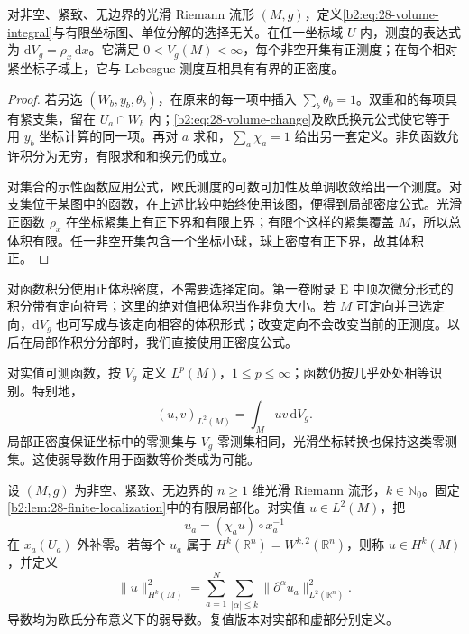 \begin{proposition}[体积积分的选择无关性]\label{b2:prop:28-volume-invariant}
对非空、紧致、无边界的光滑 Riemann 流形 \((M,g)\)，定义\eqref{b2:eq:28-volume-integral}与有限坐标图、单位分解的选择无关。在任一坐标域 \(U\) 内，测度的表达式为 \(\mathrm dV_g=\rho_x\,\mathrm dx\)。它满足 \(0<V_g(M)<\infty\)，每个非空开集有正测度；在每个相对紧坐标子域上，它与 Lebesgue 测度互相具有有界的正密度。
\end{proposition}
\begin{proof}
若另选 \((W_b,y_b,\theta_b)\)，在原来的每一项中插入 \(\sum_b\theta_b=1\)。双重和的每项具有紧支集，留在 \(U_a\cap W_b\) 内；\eqref{b2:eq:28-volume-change}及欧氏换元公式使它等于用 \(y_b\) 坐标计算的同一项。再对 \(a\) 求和，\(\sum_a\chi_a=1\) 给出另一套定义。非负函数允许积分为无穷，有限求和和换元仍成立。

对集合的示性函数应用公式，欧氏测度的可数可加性及单调收敛给出一个测度。对支集位于某图中的函数，在上述比较中始终使用该图，便得到局部密度公式。光滑正函数 \(\rho_x\) 在坐标紧集上有正下界和有限上界；有限个这样的紧集覆盖 \(M\)，所以总体积有限。任一非空开集包含一个坐标小球，球上密度有正下界，故其体积正。
\end{proof}

对函数积分使用正体积密度，不需要选择定向。第一卷附录 E 中顶次微分形式的积分带有定向符号；这里的绝对值把体积当作非负大小。若 \(M\) 可定向并已选定向，\(\mathrm dV_g\) 也可写成与该定向相容的体积形式；改变定向不会改变当前的正测度。以后在局部作积分分部时，我们直接使用正密度公式。

对实值可测函数，按 \(V_g\) 定义 \(L^p(M)\)，\(1\leq p\leq\infty\)；函数仍按几乎处处相等识别。特别地，
\[
 (u,v)_{L^2(M)}=\int_M uv\,\mathrm dV_g.
\]
局部正密度保证坐标中的零测集与 \(V_g\)-零测集相同，光滑坐标转换也保持这类零测集。这使弱导数作用于函数等价类成为可能。

\begin{definition}\label{b2:def:28-sobolev}
设 \((M,g)\) 为非空、紧致、无边界的 \(n\geq1\) 维光滑 Riemann 流形，\(k\in\mathbb N_0\)。固定\cref{b2:lem:28-finite-localization}中的有限局部化。对实值 \(u\in L^2(M)\)，把
\[
 u_a=(\chi_a u)\circ x_a^{-1}
\]
在 \(x_a(U_a)\) 外补零。若每个 \(u_a\) 属于 \(H^k(\mathbb R^n)=W^{k,2}(\mathbb R^n)\)，则称 \(u\in H^k(M)\)，并定义
\begin{equation}\label{b2:eq:28-chart-sobolev-norm}
 \|u\|_{H^k(M)}^2
 =\sum_{a=1}^N\sum_{|\alpha|\leq k}
 \|\partial^\alpha u_a\|_{L^2(\mathbb R^n)}^2.
\end{equation}
导数均为欧氏分布意义下的弱导数。复值版本对实部和虚部分别定义。
\end{definition}

